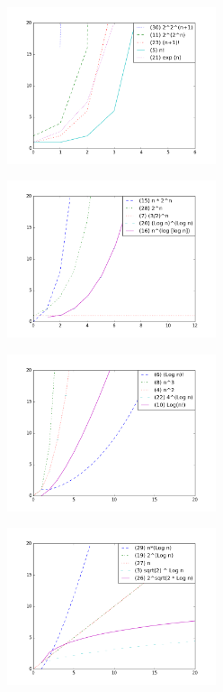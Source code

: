 \documentclass{article}
\begin{document}
\begin{figure}[h]
 
\begin{subfigure}{0.5\textwidth}
\includegraphics[width=1.1\linewidth, height=4.6cm]{img/figure_6.png} 
\label{fig:subim1}
\end{subfigure}
\begin{subfigure}{0.5\textwidth}
\includegraphics[width=1.1\linewidth, height=4.6cm]{img/figure_5.png}
\label{fig:subim2}
\end{subfigure}
 
\begin{subfigure}{0.5\textwidth}
\includegraphics[width=1.1\linewidth, height=4.6cm]{img/figure_4.png} 
\label{fig:subim1}
\end{subfigure}
\begin{subfigure}{0.5\textwidth}
\includegraphics[width=1.1\linewidth, height=4.6cm]{img/figure_3.png}
\label{fig:subim2}
\end{subfigure}
 

\end{figure}
\end{document}
